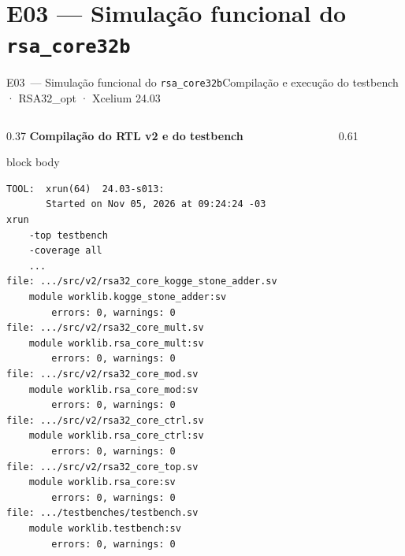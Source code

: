 \documentclass[aspectratio=169,10pt,t]{beamer}
\begin{document}
\section{E03 — Simulação funcional do \texorpdfstring{\texttt{rsa\_core32b}}{rsa\_core32b}}
\begin{frame}[fragile]{E03~— Simulação funcional do \texttt{rsa\_core32b}}{Compilação e execução do testbench · RSA32\_opt · Xcelium 24.03}
  \vspace*{-0.3cm}
  \begin{columns}[T]
    \begin{column}{0.37\textwidth}
      {\scriptsize\textbf{\color{tmCafe}Compilação do RTL v2 e do testbench}}\\[0.05cm]
      \tiny
      \begin{beamercolorbox}[rounded=true,shadow=false,sep=3pt]{block body}
\vspace*{-0.6\baselineskip}
\fontsize{4.7}{5.5}\selectfont
\begin{verbatim}
TOOL:  xrun(64)  24.03-s013:
       Started on Nov 05, 2026 at 09:24:24 -03
xrun
    -top testbench
    -coverage all
    ...
file: .../src/v2/rsa32_core_kogge_stone_adder.sv
    module worklib.kogge_stone_adder:sv
        errors: 0, warnings: 0
file: .../src/v2/rsa32_core_mult.sv
    module worklib.rsa_core_mult:sv
        errors: 0, warnings: 0
file: .../src/v2/rsa32_core_mod.sv
    module worklib.rsa_core_mod:sv
        errors: 0, warnings: 0
file: .../src/v2/rsa32_core_ctrl.sv
    module worklib.rsa_core_ctrl:sv
        errors: 0, warnings: 0
file: .../src/v2/rsa32_core_top.sv
    module worklib.rsa_core:sv
        errors: 0, warnings: 0
file: .../testbenches/testbench.sv
    module worklib.testbench:sv
        errors: 0, warnings: 0
\end{verbatim}
\vspace*{-0.6\baselineskip}
      \end{beamercolorbox}
    \end{column}
    \begin{column}{0.61\textwidth}

\end{column}
\end{columns}
\end{frame}
\end{document}
